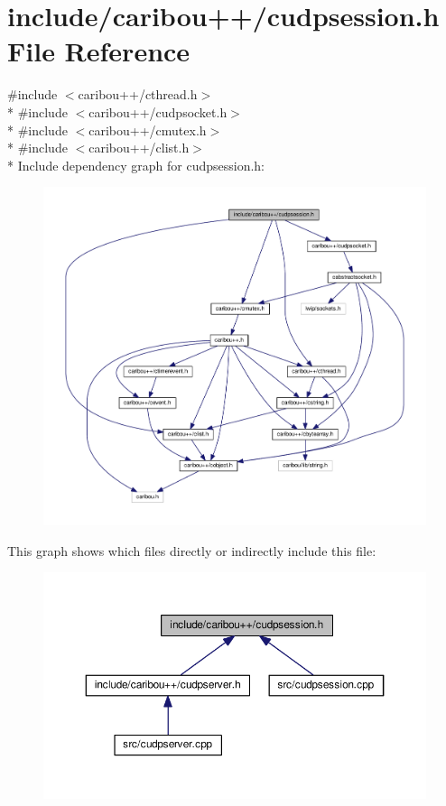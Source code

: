 \section{include/caribou++/cudpsession.h File Reference}
\label{cudpsession_8h}
{\ttfamily \#include $<$caribou++/cthread.\+h$>$}\\*
{\ttfamily \#include $<$caribou++/cudpsocket.\+h$>$}\\*
{\ttfamily \#include $<$caribou++/cmutex.\+h$>$}\\*
{\ttfamily \#include $<$caribou++/clist.\+h$>$}\\*
Include dependency graph for cudpsession.\+h\+:
\nopagebreak
\begin{figure}[H]
\begin{center}
\leavevmode
\includegraphics[width=350pt]{cudpsession_8h__incl}
\end{center}
\end{figure}
This graph shows which files directly or indirectly include this file\+:
\nopagebreak
\begin{figure}[H]
\begin{center}
\leavevmode
\includegraphics[width=350pt]{cudpsession_8h__dep__incl}
\end{center}
\end{figure}
